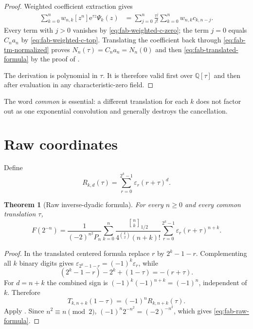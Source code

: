 \documentclass[11pt,oneside,openany]{book}
\newtheorem{theorem}{Theorem}[chapter]
\theoremstyle{definition}
\theoremstyle{remark}
\newcommand{\Qbinom}[3]{\genfrac{[}{]}{0pt}{}{#1}{#2}_{#3}}
\newcommand{\Q}{\mathbb Q}
\newcommand{\e}{\mathrm e}
\begin{document}
\begin{proof}
Weighted coefficient extraction gives
\begin{align*}
 \sum_{k=0}^nw_{n,k}[z^n]\e^{\tau z}\Psi_k(z)
 &=\sum_{j=0}^n\frac{\tau^j}{j!}
   \sum_{k=0}^nw_{n,k}c_{k,n-j}.
\end{align*}
Every term with $j>0$ vanishes by \eqref{eq:fab-weighted-c-zero}; the term $j=0$ equals $C_na_n$ by \eqref{eq:fab-weighted-c-top}.  Translating the coefficient back through \eqref{eq:fab-tm-normalized} proves $N_n(\tau)=C_na_n=N_n(0)$ and then \eqref{eq:fab-translated-formula} by the proof of .

The derivation is polynomial in $\tau$.  It is therefore valid first over $\Q[\tau]$ and then after evaluation in any characteristic-zero field.
\end{proof}

The word \emph{common} is essential: a different translation for each $k$ does not factor out as one exponential convolution and generally destroys the cancellation.

\section{Raw coordinates}

Define
\begin{equation}
 R_{k,d}(\tau)=\sum_{r=0}^{2^k-1}\varepsilon_r(r+\tau)^d.
 \label{eq:fab-raw-sum}
\end{equation}

\begin{theorem}[Raw inverse-dyadic formula]\label{thm:fab-raw}
For every $n\ge0$ and every common translation $\tau$,
\begin{equation}
 \boxed{
 F(2^{-n})=
 \frac1{(-2)^{n^2}P_n}
 \sum_{k=0}^n
 \frac{\Qbinom nk{1/2}}{4^{\binom k2}(n+k)!}
 \sum_{r=0}^{2^k-1}\varepsilon_r(r+\tau)^{n+k}.}
 \label{eq:fab-raw-formula}
\end{equation}
\end{theorem}

\begin{proof}
In the translated centered formula replace $r$ by $2^k-1-r$.  Complementing all $k$ binary digits gives
\(
 \varepsilon_{2^k-1-r}=(-1)^k\varepsilon_r
\), while
\[
 (2^k-1-r)-2^k+(1-\tau)=-(r+\tau).
\]
For $d=n+k$ the combined sign is
\(
 (-1)^k(-1)^{n+k}=(-1)^n
\), independent of $k$.  Therefore
\[
 T_{k,n+k}(1-\tau)=(-1)^nR_{k,n+k}(\tau).
\]
Apply .  Since $n^2\equiv n\pmod2$,
\(
 (-1)^n2^{-n^2}=(-2)^{-n^2}
\), which gives \eqref{eq:fab-raw-formula}.
\end{proof}
\end{document}
